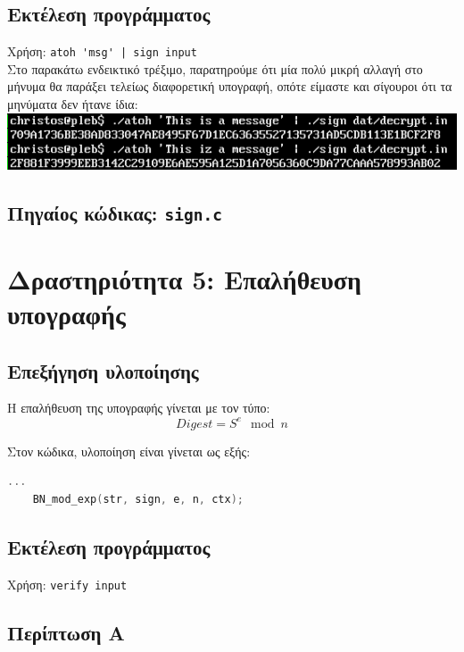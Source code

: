 \documentclass[12pt]{article}
\begin{document}
\subsection{Εκτέλεση προγράμματος}

Χρήση: \lstinline{atoh 'msg' | sign input} \\

Στο παρακάτω ενδεικτικό τρέξιμο, παρατηρούμε ότι μία πολύ μικρή αλλαγή στο
μήνυμα θα παράξει τελείως διαφορετική υπογραφή, οπότε είμαστε και σίγουροι ότι
τα μηνύματα δεν ήτανε ίδια: \\

\includegraphics[width=\textwidth]{res/sign.png} \\

\subsection{Πηγαίος κώδικας: \lstinline{sign.c}}



\section{Δραστηριότητα 5: Επαλήθευση υπογραφής}

\subsection{Επεξήγηση υλοποίησης}

Η επαλήθευση της υπογραφής γίνεται με τον τύπο:
\[Digest = S^e \mod n\]

Στον κώδικα, υλοποίηση είναι γίνεται ως εξής: \\
\begin{lstlisting}[language=C]
	...
	BN_mod_exp(str, sign, e, n, ctx);
\end{lstlisting}

\subsection{Εκτέλεση προγράμματος}

Χρήση: \lstinline{verify input} \\

\subsection{Περίπτωση Α}
\end{document}
